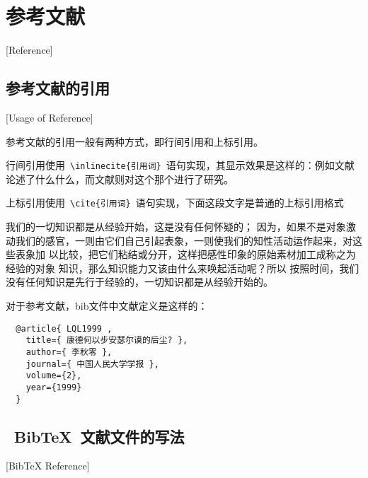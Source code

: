 
%
%
%

\chapter{参考文献}[Reference]
\label{chap07}

\section{参考文献的引用}[Usage of Reference]

参考文献的引用一般有两种方式，即行间引用和上标引用。

行间引用使用~\verb|\inlinecite{引用词}|~语句实现，其显示效果是这样的：例如文献论述了什么什么，而文献则对这个那个进行了研究。

上标引用使用~\verb|\cite{引用词}|~语句实现，下面这段文字是普通的上标引用格式

我们的一切知识都是从经验开始\cite{LQL1999}，这是没有任何怀疑的\cite{DXM2005}\cite{DXM2000}；
因为，如果不是对象激动我们的感官，一则由它们自己引起表象，一则使我们的知性活动运作起来，对这些表象加
以比较，把它们粘结或分开\cite{OJP1999,OJP1991}，这样把感性印象的原始素材加工成称之为经验的对象
知识，那么知识能力又该由什么来唤起活动呢\cite{braun2007,kelton2002,strawderman2001,LQL1999}？所以
按照时间，我们没有任何知识是先行于经验的，一切知识都是从经验开始的。

对于\cite{DXM2005}参考文献\cite{OJP1999}，bib文件中文献定义是这样的：
\begin{lstlisting}
  @article{ LQL1999 ,
    title={ 康德何以步安瑟尔谟的后尘? },
    author={ 李秋零 },
    journal={ 中国人民大学学报 },
    volume={2},
    year={1999}
  }
\end{lstlisting}

\section{~BibTeX~文献文件的写法}[BibTeX Reference]

